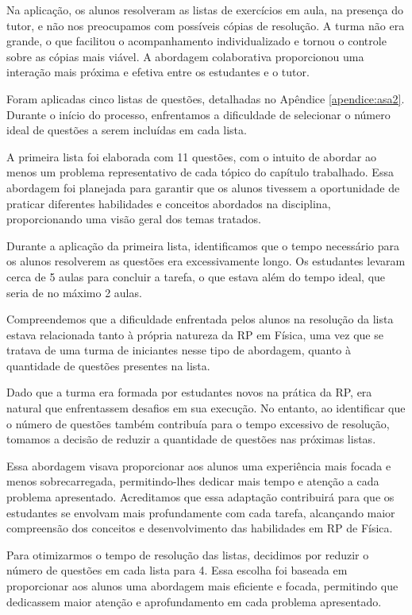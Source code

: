 Na aplicação, os alunos resolveram as listas de exercícios em aula, na presença do tutor, e não nos preocupamos com possíveis cópias de resolução. A turma não era grande, o que facilitou o acompanhamento individualizado e tornou o controle sobre as cópias mais viável. A abordagem colaborativa proporcionou uma interação mais próxima e efetiva entre os estudantes e o tutor.

Foram aplicadas cinco listas de questões, detalhadas no Apêndice \ref{apendice:asa2}. Durante o início do processo, enfrentamos a dificuldade de selecionar o número ideal de questões a serem incluídas em cada lista. 

A primeira lista foi elaborada com 11 questões, com o intuito de abordar ao menos um problema representativo de cada tópico do capítulo trabalhado. Essa abordagem foi planejada para garantir que os alunos tivessem a oportunidade de praticar diferentes habilidades e conceitos abordados na disciplina, proporcionando uma visão geral dos temas tratados.


Durante a aplicação da primeira lista, identificamos que o tempo necessário para os alunos resolverem as questões era excessivamente longo. Os estudantes levaram cerca de 5 aulas para concluir a tarefa, o que estava além do tempo ideal, que seria de no máximo 2 aulas.

Compreendemos que a dificuldade enfrentada pelos alunos na resolução da lista estava relacionada tanto à própria natureza da RP em Física, uma vez que se tratava de uma turma de iniciantes nesse tipo de abordagem, quanto à quantidade de questões presentes na lista.

Dado que a turma era formada por estudantes novos na prática da RP, era natural que enfrentassem desafios em sua execução. No entanto, ao identificar que o número de questões também contribuía para o tempo excessivo de resolução, tomamos a decisão de reduzir a quantidade de questões nas próximas listas.

Essa abordagem visava proporcionar aos alunos uma experiência mais focada e menos sobrecarregada, permitindo-lhes dedicar mais tempo e atenção a cada problema apresentado. Acreditamos que essa adaptação contribuirá para que os estudantes se envolvam mais profundamente com cada tarefa, alcançando maior compreensão dos conceitos e desenvolvimento das habilidades em RP de Física.

Para otimizarmos o tempo de resolução das listas, decidimos por reduzir o número de questões em cada lista para 4. Essa escolha foi baseada em proporcionar aos alunos uma abordagem mais eficiente e focada, permitindo que dedicassem maior atenção e aprofundamento em cada problema apresentado.

